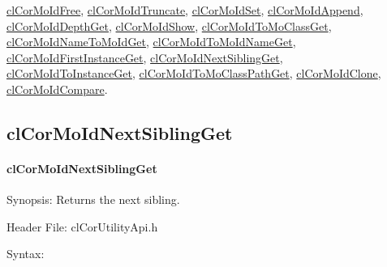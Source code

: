 \begin{flushleft}
\begin{Desc}
\hyperlink{pagecor114}{cl\-Cor\-MoId\-Free},
\hyperlink{pagecor115}{cl\-Cor\-MoId\-Truncate}, 
\hyperlink{pagecor116}{cl\-Cor\-MoId\-Set}, 
\hyperlink{pagecor117}{cl\-Cor\-MoId\-Append}, 
\hyperlink{pagecor118}{cl\-Cor\-MoId\-Depth\-Get}, 
\hyperlink{pagecor119}{cl\-Cor\-MoId\-Show}, 
\hyperlink{pagecor120}{cl\-Cor\-MoId\-To\-Mo\-Class\-Get}, 
\hyperlink{pagecor121}{cl\-Cor\-MoId\-Name\-To\-MoId\-Get}, 
\hyperlink{pagecor122}{cl\-Cor\-MoId\-To\-MoId\-Name\-Get}, 
\hyperlink{pagecor123}{cl\-Cor\-MoId\-First\-Instance\-Get},
\hyperlink{pagecor124}{cl\-Cor\-MoId\-Next\-Sibling\-Get}, 
\hyperlink{pagecor125}{cl\-Cor\-MoId\-To\-Instance\-Get}, 
\hyperlink{pagecor126}{cl\-Cor\-MoId\-To\-Mo\-Class\-Path\-Get}, 
\hyperlink{pagecor127}{cl\-Cor\-MoId\-Clone}, 
\hyperlink{pagecor128}{cl\-Cor\-MoId\-Compare}.\end{Desc}
\newpage


\subsection{clCorMoIdNextSiblingGet}
\hypertarget{pagecor124}{}\paragraph{cl\-Cor\-MoId\-Next\-Sibling\-Get}\label{pagecor124}
\begin{Desc}
\item[Synopsis:]Returns the next sibling.\end{Desc}
\begin{Desc}
\item[Header File:]clCorUtilityApi.h\end{Desc}
\begin{Desc}
\item[Syntax:]


\end{Desc}
\end{flushleft}
